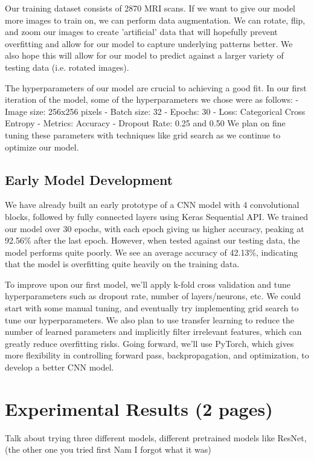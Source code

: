 \documentclass[conference]{IEEEtran}
\begin{document}
Our training dataset consists of 2870 MRI scans. If we want to give our model more images to train on, we can perform data augmentation. We can rotate, flip, and zoom our images to create 'artificial' data that will hopefully prevent overfitting and allow for our model to capture underlying patterns better. We also hope this will allow for our model to predict against a larger variety of testing data (i.e. rotated images). 

The hyperparameters of our model are crucial to achieving a good fit. In our first iteration of the model, some of the hyperparameters we chose were as follows:
- Image size: 256x256 pixels		- Batch size: 32		- Epochs: 30	
- Loss:  Categorical Cross Entropy 	- Metrics: Accuracy		- Dropout Rate: 0.25 and 0.50
We plan on fine tuning these parameters with techniques like grid search as we continue to optimize our model. 

\subsection{\large Early Model Development}

We have already built an early prototype of a CNN model with 4 convolutional blocks, followed by fully connected layers using Keras Sequential API. We trained our model over 30 epochs, with each epoch giving us higher accuracy, peaking at 92.56\% after the last epoch. However, when tested against our testing data, the model performs quite poorly. We see an average accuracy of 42.13\%, indicating that the model is overfitting quite heavily on the training data.

To improve upon our first model, we'll apply k-fold cross validation and tune hyperparameters such as dropout rate, number of layers/neurons, etc. We could start with some manual tuning, and eventually try implementing grid search to tune our hyperparameters. We also plan to use transfer learning to reduce the number of learned parameters and implicitly filter irrelevant features, which can greatly reduce overfitting risks. Going forward, we'll use PyTorch, which gives more flexibility in controlling forward pass, backpropagation, and optimization, to develop a better CNN model.


\section{\large Experimental Results (2 pages)}
Talk about trying three different models, different pretrained models like ResNet, (the other one you tried first Nam I forgot what it was)
\end{document}
